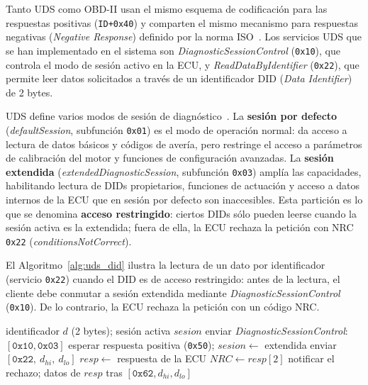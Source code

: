 Tanto UDS como OBD-II usan el mismo esquema de codificación para las respuestas positivas (\texttt{ID+0x40}) y comparten el mismo mecanismo para respuestas negativas (\textit{Negative Response}) definido por la norma ISO~\cite{ISO14229-1:2020}. Los servicios UDS que se han implementado en el sistema son \textit{DiagnosticSessionControl} (\texttt{0x10}), que controla el modo de sesión activo en la ECU, y \textit{ReadDataByIdentifier} (\texttt{0x22}), que permite leer datos solicitados a través de un identificador DID (\textit{Data Identifier}) de 2 bytes.

UDS define varios modos de sesión de diagnóstico~\cite{ISO14229-1:2020}. La \textbf{sesión por defecto} (\textit{defaultSession}, subfunción \texttt{0x01}) es el modo de operación normal: da acceso a lectura de datos básicos y códigos de avería, pero restringe el acceso a parámetros de calibración del motor y funciones de configuración avanzadas. La \textbf{sesión extendida} (\textit{extendedDiagnosticSession}, subfunción \texttt{0x03}) amplía las capacidades, habilitando lectura de DIDs propietarios, funciones de actuación y acceso a datos internos de la ECU que en sesión por defecto son inaccesibles. Esta partición es lo que se denomina \textbf{acceso restringido}: ciertos DIDs sólo pueden leerse cuando la sesión activa es la extendida; fuera de ella, la ECU rechaza la petición con NRC \texttt{0x22} (\textit{conditionsNotCorrect}).

El Algoritmo~\ref{alg:uds_did} ilustra la lectura de un dato por identificador (servicio \texttt{0x22}) cuando el DID es de acceso restringido: antes de la lectura, el cliente debe conmutar a sesión extendida mediante \textit{DiagnosticSessionControl} (\texttt{0x10}). De lo contrario, la ECU rechaza la petición con un código NRC.

\begin{algorithm}[H]
\caption{Lectura de un dato por identificador en UDS (servicio \texttt{0x22}).}
\label{alg:uds_did}
\begin{algorithmic}[1]
\Require identificador $d$ (2 bytes); sesión activa $sesion$
    \State enviar \textit{DiagnosticSessionControl}: $[\texttt{0x10}, \texttt{0x03}]$
    \State esperar respuesta positiva (\texttt{0x50}); $sesion \gets$ extendida
\EndIf
\State enviar $[\texttt{0x22},\ d_{hi},\ d_{lo}]$
\State $resp \gets$ respuesta de la ECU
 
    \State $NRC \gets resp[2]$ 
    \State notificar el rechazo; \Return
\EndIf
\State \Return datos de $resp$ tras $[\texttt{0x62}, d_{hi}, d_{lo}]$
\end{algorithmic}
\end{algorithm}

